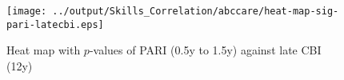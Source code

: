     \begin{figure}[H]   
      \centering
      \caption{Heat map with $p$-values of PARI (0.5y to 1.5y) against late CBI (12y)}    
      \texttt{[image: ../output/Skills\_Correlation/abccare/heat-map-sig-pari-latecbi.eps]}
      \label{fig:pari-latecbi}
    \end{figure}

